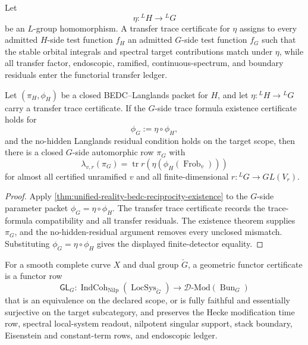 \begin{definition}
\label{def:unified-reality-transfer-trace-certificate}
Let
$$
\eta:{}^LH\longrightarrow{}^LG
$$
be an $L$-group homomorphism. A transfer trace certificate for $\eta$
assigns to every admitted $H$-side test function $f_H$ an admitted
$G$-side test function $f_G$ such that the stable orbital integrals and
spectral target contributions match under $\eta$, while all transfer
factor, endoscopic, ramified, continuous-spectrum, and boundary residuals
enter the functorial transfer ledger.
\end{definition}

\begin{theorem}
\label{thm:unified-reality-functoriality-from-transfer-trace}
Let $(\pi_H,\phi_H)$ be a closed BEDC--Langlands packet for $H$, and let
$\eta:{}^LH\to{}^LG$ carry a transfer trace certificate. If the
$G$-side trace formula existence certificate holds for
$$
\phi_G:=\eta\circ\phi_H,
$$
and the no-hidden Langlands residual condition holds on the target
scope, then there is a closed $G$-side automorphic row $\pi_G$ with
$$
\lambda_{v,r}(\pi_G)
=
\operatorname{tr}r(\eta(\phi_H(\operatorname{Frob}_v)))
$$
for almost all certified unramified $v$ and all finite-dimensional
$r:{}^LG\to GL(V_r)$.
\end{theorem}
\begin{proof}
Apply
\autoref{thm:unified-reality-bedc-reciprocity-existence} to the
$G$-side parameter packet $\phi_G=\eta\circ\phi_H$. The transfer trace
certificate records the trace-formula compatibility and all transfer
residuals. The existence theorem supplies $\pi_G$, and the
no-hidden-residual argument removes every unclosed mismatch. Substituting
$\phi_G=\eta\circ\phi_H$ gives the displayed finite-detector equality.
\end{proof}

\begin{definition}
\label{def:unified-reality-geometric-functor-certificate}
For a smooth complete curve $X$ and dual group $\check G$, a geometric
functor certificate is a functor row
$$
\mathsf{GL}_G:
\operatorname{IndCoh}_{\operatorname{Nilp}}(\operatorname{LocSys}_{\check G})
\longrightarrow
\mathcal D\text{-Mod}(\operatorname{Bun}_G)
$$
that is an equivalence on the declared scope, or is fully faithful and
essentially surjective on the target subcategory, and preserves the
Hecke modification time row, spectral local-system readout, nilpotent
singular support, stack boundary, Eisenstein and constant-term rows, and
endoscopic ledger.
\end{definition}

